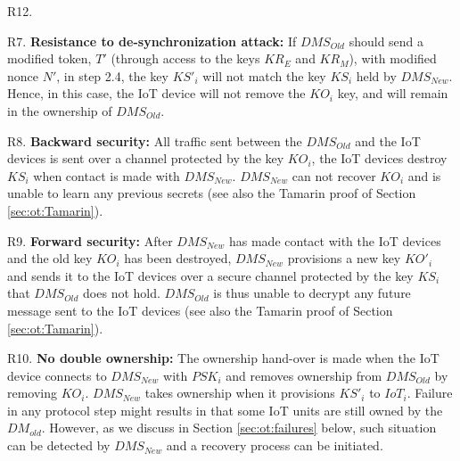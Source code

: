 {\begin{labeling}{R12.}
\item [R7.] \textbf{Resistance to de-synchronization attack:} %
If $DMS_{Old}$ should send a modified token, $T'$ (through access to the keys $KR_E$ and $KR_M$), with modified nonce $N'$, in step 2.4, the key $KS'_i$ will not match the key $KS_i$ held by $DMS_{New}$. Hence, in this case, the IoT device will not remove the $KO_i$ key, and will remain in the ownership of $DMS_{Old}$.
\item [R8.] \textbf{Backward security:} %
All traffic sent between the $DMS_{Old}$ and the IoT devices is sent over a channel protected by the key $KO_i$, the IoT devices destroy $KS_i$ when contact is made with $DMS_{New}$. $DMS_{New}$ can not recover $KO_i$ and is unable to learn any previous secrets (see also the Tamarin proof of Section \ref{sec:ot:Tamarin}).
\item [R9.] \textbf{Forward security:} %
After $DMS_{New}$ has made contact with the IoT devices and the old key $KO_i$ has been destroyed, $DMS_{New}$ provisions a new key $KO'_i$ and sends it to the IoT devices over a secure channel protected by the key $KS_i$ that $DMS_{Old}$ does not hold. $DMS_{Old}$ is thus unable to decrypt any future message sent to the IoT devices  (see also the Tamarin proof of Section \ref{sec:ot:Tamarin}).
 \item [R10.] \textbf{No double ownership:} %
 The ownership hand-over is made when the IoT device connects to $DMS_{New}$ with $PSK_i$ and removes ownership from $DMS_{Old}$ by removing $KO_i$. $DMS_{New}$ takes ownership when it provisions $KS'_i$ to $IoT_i$. Failure in any protocol step might results in that some IoT units are still owned by the $DM_{old}$. However, as we discuss in Section \ref{sec:ot:failures} below, such situation can be detected by $DMS_{New}$ and a recovery process can be initiated.

\end{labeling}}
